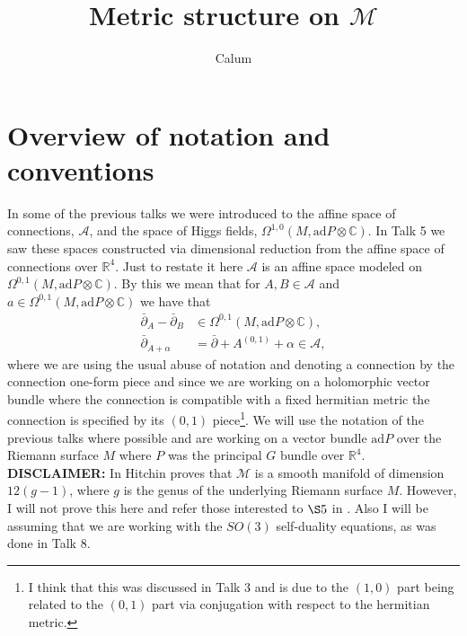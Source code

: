 % 



\title{Metric structure on $\mathcal{M}$}
\author{Calum}
\date{}

 
\maketitle
\parindent 0pt
\section{Overview of notation and conventions}
In some of the previous talks we were introduced to the affine space of connections, $\mathcal{A}$, and the space of Higgs fields, $ \Omega ^{1,0} ( M, \mathrm{ad} P \otimes \mathbb{C} )$. In Talk 5 we saw these spaces constructed via dimensional reduction from the affine space of connections over $\mathbb{R}^{4}$. Just to restate it here $\mathcal{A}$ is an affine space modeled on $\Omega^{0,1}(M,\text{ad}P\otimes \mathbb{C})$. By this we mean that for $A,B\in \mathcal{A}$ and $a\in \Omega^{0,1}(M,\text{ad}P\otimes \mathbb{C})$ we have that
\begin{align}
\bar{\partial}_{A}-\bar{\partial}_{B}&\in \Omega^{0,1}(M,\text{ad}P\otimes \mathbb{C}),\\
\bar{\partial}_{A+\alpha}&=\bar{\partial}+A^{(0,1)}+\alpha \in\mathcal{A},
\end{align}
where we are using the usual abuse of notation and denoting a connection by the connection one-form piece and since we are working on a holomorphic vector bundle where the connection is compatible with a fixed hermitian metric  the connection is specified by its $(0,1)$ piece\footnote{I think that this was discussed in Talk 3 and is due to the $(1,0)$ part being related to the $(0,1)$ part via conjugation with respect to the hermitian metric.}. We will use the notation of the previous talks where possible and are working on a vector bundle $\text{ad}P$ over the Riemann surface $M$  where $P$ was the principal $G$ bundle over $\mathbb{R}^{4}$.\\

\textbf{DISCLAIMER:} In \cite{Hitchin} Hitchin proves that $\mathcal{M}$ is a smooth manifold of dimension $12(g-1)$, where $g$ is the genus of the underlying Riemann surface $M$. However, I will not prove this here and refer those interested to $\S 5$ in \cite{Hitchin}. Also I will be assuming that we are working with the $SO(3)$ self-duality equations, as was done in Talk 8.\\

